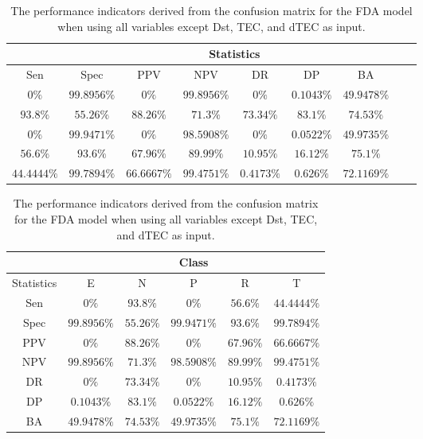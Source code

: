\begin{table}[!ht]
	\centering
	\begin{tabular}{|c|c|c|c|c|c|c|c|c|}
		\hline
		 & \multicolumn{7}{c|}{Statistics} \\ \hline
		Sen & Spec & PPV & NPV & DR & DP & BA \\ \hline
		$0\%$ & $99.8956\%$ & $0\%$ & $99.8956\%$ & $0\%$ & $0.1043\%$ & $49.9478\%$ \\ \hline
		$93.8\%$ & $55.26\%$ & $88.26\%$ & $71.3\%$ & $73.34\%$ & $83.1\%$ & $74.53\%$ \\ \hline
		$0\%$ & $99.9471\%$ & $0\%$ & $98.5908\%$ & $0\%$ & $0.0522\%$ & $49.9735\%$ \\ \hline
		$56.6\%$ & $93.6\%$ & $67.96\%$ & $89.99\%$ & $10.95\%$ & $16.12\%$ & $75.1\%$ \\ \hline
		$44.4444\%$ & $99.7894\%$ & $66.6667\%$ & $99.4751\%$ & $0.4173\%$ & $0.626\%$ & $72.1169\%$ \\ \hline
	\end{tabular}
	\caption{The performance indicators derived from the confusion matrix for the FDA model when using all variables except Dst, TEC, and dTEC as input.}
	\label{tab:cs:noTEC:fda}
\end{table}

\begin{table}[!ht]
	\centering
	\begin{tabular}{|c|c|c|c|c|c|}
		\hline
		 & \multicolumn{5}{c|}{Class} \\ \hline
		Statistics & E & N & P & R & T \\ \hline
		Sen & $0\%$ & $93.8\%$ & $0\%$ & $56.6\%$ & $44.4444\%$ \\ \hline
		Spec & $99.8956\%$ & $55.26\%$ & $99.9471\%$ & $93.6\%$ & $99.7894\%$ \\ \hline
		PPV & $0\%$ & $88.26\%$ & $0\%$ & $67.96\%$ & $66.6667\%$ \\ \hline
		NPV & $99.8956\%$ & $71.3\%$ & $98.5908\%$ & $89.99\%$ & $99.4751\%$ \\ \hline
		DR & $0\%$ & $73.34\%$ & $0\%$ & $10.95\%$ & $0.4173\%$ \\ \hline
		DP & $0.1043\%$ & $83.1\%$ & $0.0522\%$ & $16.12\%$ & $0.626\%$ \\ \hline
		BA & $49.9478\%$ & $74.53\%$ & $49.9735\%$ & $75.1\%$ & $72.1169\%$ \\ \hline
	\end{tabular}
	\caption{The performance indicators derived from the confusion matrix for the FDA model when using all variables except Dst, TEC, and dTEC as input.}
	\label{tab:cs:reverse:noTEC:fda}
\end{table}
